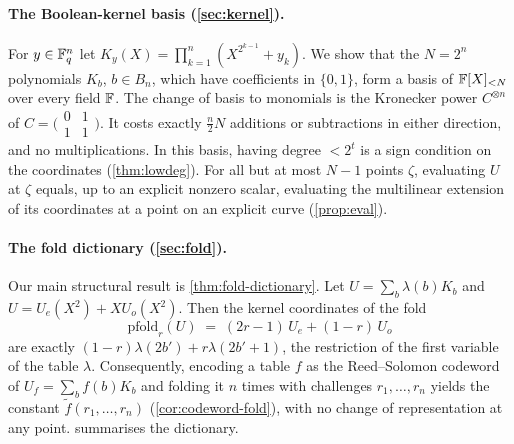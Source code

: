 \paragraph{The Boolean-kernel basis (\cref{sec:kernel}).}
For $y \in \mathbb{F}_q^n$ let $K_y(X) = \prod_{k=1}^{n}(X^{2^{k-1}} + y_k)$.
We show that the $N = 2^n$ polynomials $K_b$, $b \in B_n$, which have coefficients in $\{0,1\}$, form a basis of $\mathbb{F}[X]_{<N}$ over every field $\mathbb{F}$.
The change of basis to monomials is the Kronecker power $C^{\otimes n}$ of $C = \bigl(\begin{smallmatrix} 0 & 1 \\ 1 & 1\end{smallmatrix}\bigr)$.
It costs exactly $\tfrac{n}{2}N$ additions or subtractions in either direction, and no multiplications.
In this basis, having degree $< 2^t$ is a sign condition on the coordinates (\cref{thm:lowdeg}).
For all but at most $N-1$ points $\zeta$, evaluating $U$ at $\zeta$ equals, up to an explicit nonzero scalar, evaluating the multilinear extension of its coordinates at a point on an explicit curve (\cref{prop:eval}).

\paragraph{The fold dictionary (\cref{sec:fold}).}
Our main structural result is \cref{thm:fold-dictionary}.
Let $U = \sum_b \lambda(b) K_b$ and $U = U_e(X^2) + X U_o(X^2)$. Then the kernel coordinates of the fold
\[
  \mathrm{pfold}_r(U) \;=\; (2r-1)\,U_e + (1-r)\,U_o
\]
are exactly $(1-r)\lambda(2b') + r\lambda(2b'+1)$, the restriction of the first variable of the table $\lambda$.
Consequently, encoding a table $f$ as the Reed--Solomon codeword of $U_f = \sum_b f(b) K_b$ and folding it $n$ times with challenges $r_1,\dots,r_n$ yields the constant $\tilde f(r_1,\dots,r_n)$ (\cref{cor:codeword-fold}), with no change of representation at any point.
 summarises the dictionary.

